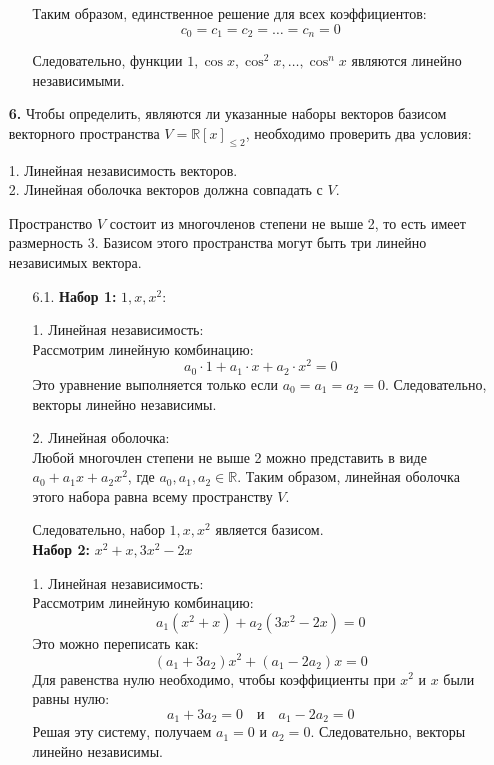 \documentclass[a4paper]{article}
\begin{document}
\begin{enumerate}
\begin{enumerate}
        Таким образом, единственное решение для всех коэффициентов:
        $$
        c_0 = c_1 = c_2 = \ldots = c_n = 0
        $$

        Следовательно, функции $ 1, \cos x, \cos^2 x, \ldots, \cos^n x $ являются линейно независимыми.\\
    \end{enumerate}

    \item[\textbf{6.}]Чтобы определить, являются ли указанные наборы векторов базисом векторного пространства $ V = \mathbb{R}[x]_{\leqslant 2} $, необходимо проверить два условия:

    1. Линейная независимость векторов.\\
    2. Линейная оболочка векторов должна совпадать с $ V $.
    
    Пространство $ V $ состоит из многочленов степени не выше 2, то есть имеет размерность 3. Базисом этого пространства могут быть три линейно независимых вектора.

    \begin{enumerate}
        \item[6.1.]
        \textbf{Набор 1:} $ 1, x, x^2 $:
        
        1. Линейная независимость:\\
        Рассмотрим линейную комбинацию:
        $$
        a_0 \cdot 1 + a_1 \cdot x + a_2 \cdot x^2 = 0
        $$
        Это уравнение выполняется только если $ a_0 = a_1 = a_2 = 0 $. Следовательно, векторы линейно независимы.

        2. Линейная оболочка: \\
        Любой многочлен степени не выше 2 можно представить в виде $ a_0 + a_1 x + a_2 x^2 $, где $ a_0, a_1, a_2 \in \mathbb{R} $. Таким образом, линейная оболочка этого набора равна всему пространству $ V $.

        Следовательно, набор $ 1, x, x^2 $ является базисом.\\

        
        \textbf{Набор 2:} $ x^2 + x, 3x^2 - 2x $

        1. Линейная независимость:\\
        Рассмотрим линейную комбинацию:
        $$
        a_1 (x^2 + x) + a_2 (3x^2 - 2x) = 0
        $$
        Это можно переписать как:
        $$
        (a_1 + 3a_2)x^2 + (a_1 - 2a_2)x = 0
        $$
        Для равенства нулю необходимо, чтобы коэффициенты при $ x^2 $ и $ x $ были равны нулю:
        $$
        a_1 + 3a_2 = 0 \quad \text{и} \quad a_1 - 2a_2 = 0
        $$
        Решая эту систему, получаем $ a_1 = 0 $ и $ a_2 = 0 $. Следовательно, векторы линейно независимы.


\end{enumerate}
\end{enumerate}
\end{document}

